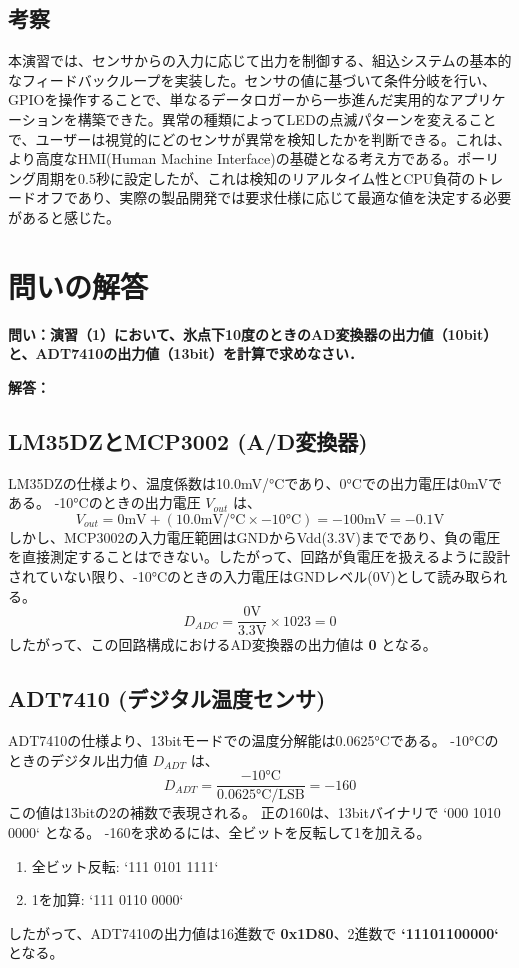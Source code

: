 \documentclass[a4paper,11pt,dvipdfmx]{jsarticle}
\begin{document}
\subsection{考察}
本演習では、センサからの入力に応じて出力を制御する、組込システムの基本的なフィードバックループを実装した。センサの値に基づいて条件分岐を行い、GPIOを操作することで、単なるデータロガーから一歩進んだ実用的なアプリケーションを構築できた。異常の種類によってLEDの点滅パターンを変えることで、ユーザーは視覚的にどのセンサが異常を検知したかを判断できる。これは、より高度なHMI(Human Machine Interface)の基礎となる考え方である。ポーリング周期を0.5秒に設定したが、これは検知のリアルタイム性とCPU負荷のトレードオフであり、実際の製品開発では要求仕様に応じて最適な値を決定する必要があると感じた。

\section{問いの解答}
\textbf{問い：演習（1）において、氷点下10度のときのAD変換器の出力値（10bit）と、ADT7410の出力値（13bit）を計算で求めなさい．}

\textbf{解答：}
\subsection{LM35DZとMCP3002 (A/D変換器)}
LM35DZの仕様より、温度係数は10.0mV/°Cであり、0°Cでの出力電圧は0mVである。
-10°Cのときの出力電圧 $V_{out}$ は、
\begin{equation}
V_{out} = 0 \text{mV} + (10.0 \text{mV/°C} \times -10 \text{°C}) = -100 \text{mV} = -0.1 \text{V}
\end{equation}
しかし、MCP3002の入力電圧範囲はGNDからVdd(3.3V)までであり、負の電圧を直接測定することはできない。したがって、回路が負電圧を扱えるように設計されていない限り、-10°Cのときの入力電圧はGNDレベル(0V)として読み取られる。
\begin{equation}
D_{ADC} = \frac{0 \text{V}}{3.3 \text{V}} \times 1023 = 0
\end{equation}
したがって、この回路構成におけるAD変換器の出力値は \textbf{0} となる。

\subsection{ADT7410 (デジタル温度センサ)}
ADT7410の仕様より、13bitモードでの温度分解能は0.0625°Cである。
-10°Cのときのデジタル出力値 $D_{ADT}$ は、
\begin{equation}
D_{ADT} = \frac{-10 \text{°C}}{0.0625 \text{°C/LSB}} = -160
\end{equation}
この値は13bitの2の補数で表現される。
正の160は、13bitバイナリで `000 1010 0000` となる。
-160を求めるには、全ビットを反転して1を加える。
\begin{enumerate}
    \item 全ビット反転: `111 0101 1111`
    \item 1を加算: `111 0110 0000`
\end{enumerate}
したがって、ADT7410の出力値は16進数で \textbf{0x1D80}、2進数で \textbf{`11101100000`} となる。
\end{document}
